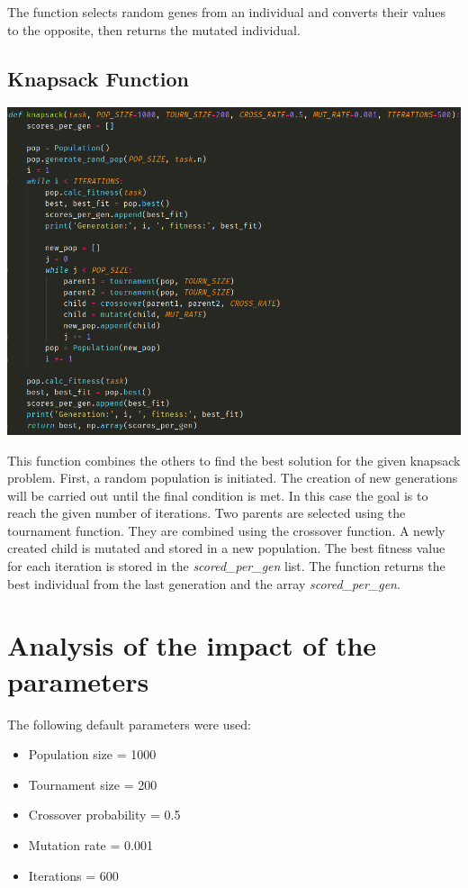 \documentclass[12pt]{article}
\begin{document}
The function selects random genes from an individual and converts their values to the opposite, then returns the mutated individual.

\subsection{Knapsack Function}
\begin{center}
	\includegraphics[scale=0.5]{knapsack}
\end{center}

This function combines the others to find the best solution for the given knapsack problem. First, a random population is initiated. 
The creation of new generations will be carried out until the final condition is met. In this case the goal is to reach the given number of iterations. Two parents are selected using the tournament function. They are combined using the crossover function. A newly created child is mutated and stored in a new population. The best fitness value for each iteration is stored in the \emph{scored\_per\_gen} list. The function returns the best individual from the last generation and the array \emph{scored\_per\_gen}.

\section{Analysis of the impact of the parameters}
The following default parameters were used: 
\begin{itemize}
\item Population size = 1000
\item Tournament size = 200
\item Crossover probability = 0.5
\item Mutation rate = 0.001
\item Iterations = 600
\end{itemize}
\end{document}

